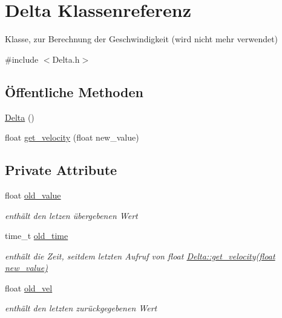 \hypertarget{class_delta}{
\section{Delta Klassenreferenz}
\label{class_delta}
}


Klasse, zur Berechnung der Geschwindigkeit (wird nicht mehr verwendet)  




{\ttfamily \#include $<$Delta.h$>$}

\subsection*{Öffentliche Methoden}
\begin{DoxyCompactItemize}
\item 
\hyperlink{class_delta_a20c7bcc600ccfdf7a678872fa4d1a7a7}{Delta} ()
\item 
float \hyperlink{class_delta_a16d1cf25743928796d7cf1e5c7882c17}{get\_\-velocity} (float new\_\-value)
\end{DoxyCompactItemize}
\subsection*{Private Attribute}
\begin{DoxyCompactItemize}
\item 
float \hyperlink{class_delta_a1724264763801016d7d1c0d5f4817a96}{old\_\-value}
\begin{DoxyCompactList}\small\item\em enthält den letzen übergebenen Wert \end{DoxyCompactList}\item 
time\_\-t \hyperlink{class_delta_aec1a12c9785ec159f541663926eda55d}{old\_\-time}
\begin{DoxyCompactList}\small\item\em enthält die Zeit, seitdem letzten Aufruf von float \hyperlink{class_delta_a16d1cf25743928796d7cf1e5c7882c17}{Delta::get\_\-velocity(float new\_\-value)} \end{DoxyCompactList}\item 
float \hyperlink{class_delta_a479029e6db0f2738547961f0d72bec78}{old\_\-vel}
\begin{DoxyCompactList}\small\item\em enthält den letzten zurückgegebenen Wert \end{DoxyCompactList}\end{DoxyCompactItemize}


